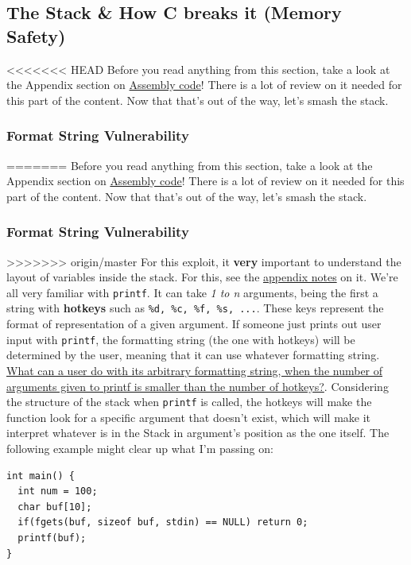 \documentclass[11pt]{article}
\begin{document}
\subsection{The Stack \& How C breaks it (Memory Safety)}
<<<<<<< HEAD
\label{sec:org1a3fa47}
Before you read anything from this section, take a look at the Appendix section on \hyperref[sec:Assemble]{Assembly code}! There is a lot of review on it needed for this part of the content. Now that that's out of the way, let's smash the stack.
\subsubsection{Format String Vulnerability}
\label{sec:orgfb9e460}
=======
\label{sec:org0aeb71e}
Before you read anything from this section, take a look at the Appendix section on \hyperref[sec:Assemble]{Assembly code}! There is a lot of review on it needed for this part of the content. Now that that's out of the way, let's smash the stack.
\subsubsection{Format String Vulnerability}
\label{sec:org96a0649}
>>>>>>> origin/master
  For this exploit, it \textbf{very} important to understand the layout of variables inside the stack. For this, see the \hyperref[sec:VarLayoutStack]{appendix notes} on it.
We're all very familiar with \texttt{printf}. It can take \emph{1 to n} arguments, being the first a string with \textbf{hotkeys} such as \texttt{\%d, \%c, \%f, \%s, ...}. These keys represent the format of representation of a given argument. If someone just prints out user input with \texttt{printf}, the formatting string (the one with hotkeys) will be determined by the user, meaning that it can use whatever formatting string. \uline{What can a user do with its arbitrary formatting string, when the number of arguments given to printf is smaller than the number of hotkeys?}. Considering the structure of the stack when \texttt{printf} is called, the hotkeys will make the function look for a specific argument that doesn't exist, which will make it interpret whatever is in the Stack in argument's position as the one itself. The following example might clear up what I'm passing on:

\begin{verbatim}
int main() {
  int num = 100;
  char buf[10];
  if(fgets(buf, sizeof buf, stdin) == NULL) return 0;
  printf(buf);
}
\end{verbatim}
\end{document}

